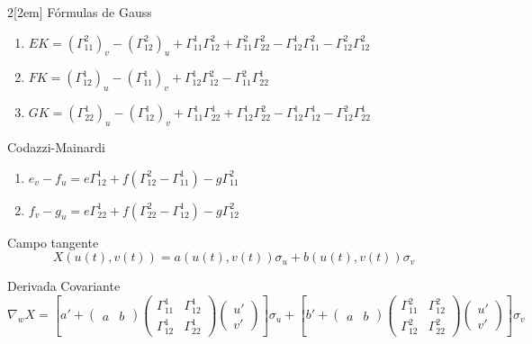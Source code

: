 \documentclass[leqno]{article}
\begin{document}
\begin{multicols}{2}[\columnsep2em]
Fórmulas de Gauss
\begin{enumerate}[topsep=-6pt, itemsep=0pt]
    \item $EK = (\Gamma_{11}^2)_v - (\Gamma_{12}^2)_u + \Gamma_{11}^1\Gamma_{12}^2 + \Gamma_{11}^2\Gamma_{22}^2 - \Gamma_{12}^1\Gamma_{11}^2 - \Gamma_{12}^2\Gamma_{12}^2$
    \item $FK = (\Gamma_{12}^1)_u - (\Gamma_{11}^1)_v + \Gamma_{12}^1\Gamma_{12}^2 - \Gamma_{11}^2\Gamma_{22}^1$
    \item $GK = (\Gamma_{22}^1)_u - (\Gamma_{12}^1)_v + \Gamma_{11}^1\Gamma_{22}^1 + \Gamma_{12}^1\Gamma_{22}^2 - \Gamma_{12}^1\Gamma_{12}^1 - \Gamma_{12}^2\Gamma_{22}^1$
  \end{enumerate}

  Codazzi-Mainardi
  \begin{enumerate}[topsep=-6pt, itemsep=0pt]
    \item $e_v-f_u = e\Gamma_{12}^1 + f(\Gamma_{12}^2 - \Gamma _{11}^1) - g\Gamma_{11}^2$
	\item $f_v-g_u = e\Gamma_{22}^1 + f(\Gamma_{22}^2-\Gamma_{12}^1)-g\Gamma_{12}^2$
  \end{enumerate}


\end{multicols}
\newpage

Campo tangente
\[
X(u(t), v(t)) = a(u(t), v(t))\sigma _u + b(u(t), v(t))\sigma _v
\]

Derivada Covariante
\[
  \nabla _wX = \left[ a' + \begin{pmatrix} a & b \end{pmatrix} \begin{pmatrix} \Gamma_{11}^1 & \Gamma _{12}^1 \\ \Gamma _{12}^1 & \Gamma_{22}^1 \end{pmatrix} \begin{pmatrix} u' \\ v' \end{pmatrix}   \right] \sigma _u + \left[ b' + \begin{pmatrix} a & b \end{pmatrix} \begin{pmatrix} \Gamma _{11}^2 & \Gamma _{12}^2 \\ \Gamma _{12}^2 & \Gamma _{22}^2 \end{pmatrix} \begin{pmatrix} u' \\ v' \end{pmatrix}   \right] \sigma _v
\]
\end{document}
